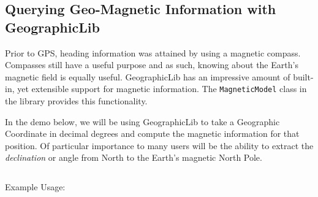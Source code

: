 %
%


\subsection*{Querying Geo-Magnetic Information with GeographicLib }

Prior to GPS, heading information was attained by using a magnetic compass.  Compasses still have a useful purpose and 
as such, knowing about the Earth's magnetic field is equally useful.  GeographicLib has an impressive amount of 
built-in, yet extensible support for magnetic information.  The \texttt{MagneticModel} class in the library provides
this functionality. 

In the demo below, we will be using GeographicLib to take a Geographic Coordinate in decimal degrees
and compute the magnetic information for that position.  Of particular importance to many users will
be the ability to extract the \emph{declination} or angle from North to the Earth's magnetic North Pole.


\inputminted{C++}{../code/chapter6/geographiclib-magnetic-query.cpp}

Example Usage:


